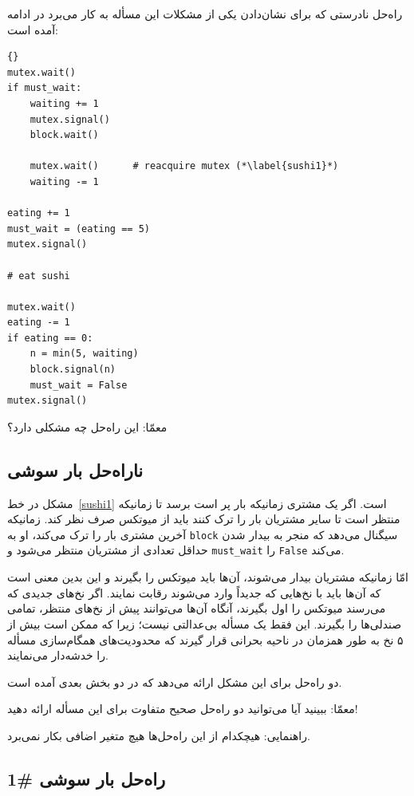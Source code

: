 \documentclass{book}
\newcommand{\clearemptydoublepage}{\newpage\cleardoublepage}
\begin{document}
    راه‌حل نادرستی که  برای نشان‌دادن یکی از مشکلات این مسأله به کار می‌برد در ادامه آمده است: 

\begin{latin}
\begin{lstlisting}[title=\rl{ناراه‌حل بار سوشی}]{}
mutex.wait()
if must_wait:
    waiting += 1
    mutex.signal()
    block.wait()

    mutex.wait()      # reacquire mutex (*\label{sushi1}*)
    waiting -= 1

eating += 1
must_wait = (eating == 5)
mutex.signal()

# eat sushi

mutex.wait()
eating -= 1
if eating == 0:
    n = min(5, waiting)
    block.signal(n)
    must_wait = False
mutex.signal()
\end{lstlisting}
\end{latin}

    معمّا: این راه‌حل چه مشکلی دارد؟


\clearemptydoublepage
\subsection{ناراه‌حل بار سوشی}

    مشکل در خط~\ref{sushi1} است. اگر یک مشتری زمانیکه بار پر است برسد تا زمانیکه منتظر است تا سایر مشتریان بار را ترک کنند باید از میوتکس 
    صرف نظر کند. زمانیکه آخرین مشتری بار را ترک می‌کند، او به {\tt block} سیگنال می‌دهد که منجر به بیدار شدن حداقل تعدادی از مشتریان منتظر 
    می‌شود و {\tt must\_wait} را \texttt{False} می‌کند. 
    

    امّا زمانیکه مشتریان بیدار می‌شوند، آن‌ها باید میوتکس را بگیرند و این بدین معنی است که آن‌ها باید با نخ‌هایی که جدیداً وارد می‌شوند رقابت نمایند. 
    اگر نخ‌های جدیدی که می‌رسند میوتکس را اول بگیرند، آنگاه آن‌ها می‌توانند پیش از نخ‌های منتظر، تمامی صندلی‌ها را بگیرند. این فقط یک مسأله بی‌عدالتی
    نیست؛ زیرا که ممکن است بیش از ۵ نخ به طور همزمان در ناحیه بحرانی قرار گیرند که محدودیت‌های همگام‌سازی مسأله را خدشه‌دار می‌نمایند. 

    دو راه‌حل برای این مشکل ارائه می‌دهد که در دو بخش بعدی آمده است. 

    معمّا: ببینید آیا می‌توانید دو راه‌حل صحیح متفاوت برای این مسأله ارائه دهید!

    راهنمایی: هیچکدام از این راه‌حل‌ها هیچ متغیر اضافی بکار نمی‌برد. 

\clearemptydoublepage
\subsection{راه‌حل بار سوشی  \#1}
\end{document}
